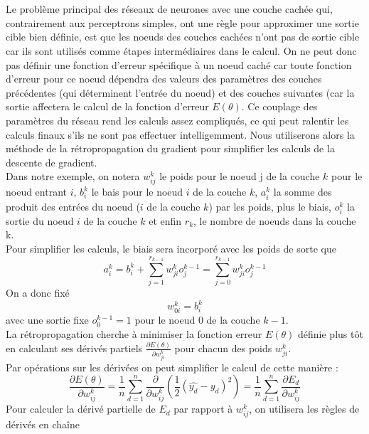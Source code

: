         \\\\
        Le problème principal des réseaux de neurones avec une couche cachée qui, contrairement aux perceptrons simples, ont une règle pour approximer une sortie cible bien définie, est que les noeuds des couches cachées n'ont pas de sortie cible car ils sont utilisés comme étapes intermédiaires dans le calcul. On ne peut donc pas définir une fonction d'erreur spécifique à un noeud caché car toute fonction d'erreur pour ce noeud dépendra des valeurs des paramètres des couches précédentes (qui déterminent l'entrée du noeud) et des couches suivantes (car la sortie affectera le calcul de la fonction d'erreur $E(\theta)$. Ce couplage des paramètres du réseau rend les calculs assez compliqués, ce qui peut ralentir les calculs finaux s'ils ne sont pas effectuer intelligemment. Nous utiliserons alors la méthode de la rétropropagation du gradient pour simplifier les calculs de la descente de gradient. \\
        Dans notre exemple, on notera $w^k_{ij}$ le poids pour le noeud j de la couche $k$ pour le noeud entrant $i$, $b^k_i$ le bais pour le noeud $i$ de la couche $k$, $a_i^k$ la somme des produit des entrées du noeud ($i$ de la couche $k$) par les poids, plus le biais, $o^k_i$ la sortie du noeud $i$ de la couche $k$ et enfin $r_k$, le nombre de noeuds dans la couche k.
        \\Pour simplifier les calculs, le biais sera incorporé avec les poids de sorte que 
        $$
        a^k_i = b^k_i + \sum^{r_{k-1}}_{j=1}w^k_{ji}o^{k-1}_j = \sum^{r_{k-1}}_{j=0}w^k_{ji}o^{k-1}_j
        $$
        On a donc fixé
        $$
        w^k_{0i} = b^k_i
        $$
        avec une sortie fixe $o^{k-1}_0 = 1$ pour le noeud 0 de la couche $k-1$.\\
        La rétropropagation cherche à minimiser la fonction erreur $E(\theta)$ définie plus tôt en calculant ses dérivés partiels $\frac{\partial E(\theta)}{\partial w^k_{ji}}$ pour chacun des poids $w^k_{ji}$.
        \\Par opérations sur les dérivées on peut simplifier le calcul de cette manière :
        \begin{equation}
        \frac{\partial E(\theta)}{\partial w^k_{ij}} = \frac{1}{n}\sum^n_{d=1}\frac{\partial}{\partial w_{ij}^k}\left(\frac{1}{2}(\hat{y_d}-y_d)^2\right) = \frac{1}{n}\sum^n_{d=1}\frac{\partial E_d}{\partial w_{ij}^k}
        \label{eq:formule1}
        \end{equation}
        Pour calculer la dérivé partielle de $E_d$ par rapport à $w^k_{ij}$, on utilisera les règles de dérivés en chaîne
